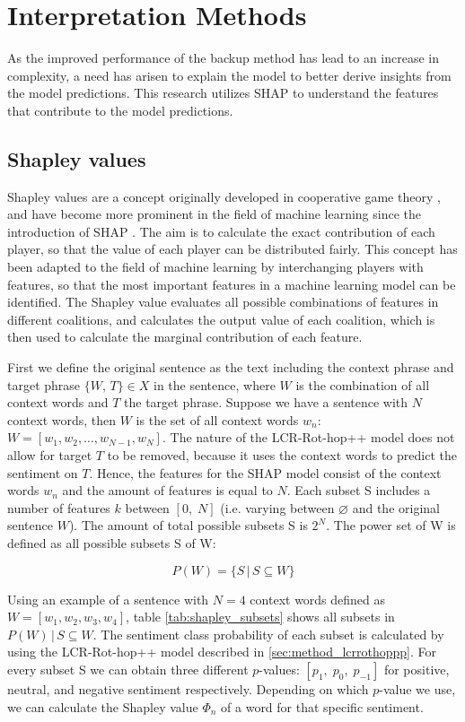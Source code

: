 \section{Interpretation Methods}
    \label{sec:method_interpretation}
As the improved performance of the backup method has lead to an increase in complexity, a need has arisen to explain the model to better derive insights from the model predictions. This research utilizes SHAP to understand the features that contribute to the model predictions. 

\subsection{Shapley values}
    \label{sec:method_shapley}
Shapley values are a concept originally developed in cooperative game theory \cite{Shapley}, and have become more prominent in the field of machine learning since the introduction of SHAP \cite{Lundberg}. The aim is to calculate the exact contribution of each player, so that the value of each player can be distributed fairly. This concept has been adapted to the field of machine learning by interchanging players with features, so that the most important features in a machine learning model can be identified. The Shapley value evaluates all possible combinations of features in different coalitions, and calculates the output value of each coalition, which is then used to calculate the marginal contribution of each feature.

First we define the original sentence as the text including the context phrase and target phrase $\{W,\, T\} \in X$ in the sentence, where $W$ is the combination of all context words and $T$ the target phrase. Suppose we have a sentence with $N$ context words, then $W$ is the set of all context words $w_n$: $W=[w_1, w_2, \ldots, w_{N-1}, w_N]$. The nature of the LCR-Rot-hop++ model does not allow for target $T$ to be removed, because it uses the context words to predict the sentiment on $T$. Hence, the features for the SHAP model consist of the context words $w_n$ and the amount of features is equal to $N$. Each subset S includes a number of features $k$ between $[0,\;N]$ (i.e. varying between $\varnothing$ and the original sentence $W$). The amount of total possible subsets S is $2^N$. The power set of W is defined as all possible subsets S of W:

$$
P(W)= \{S \,|\, S \subseteq W\}
$$

Using an example of a sentence with $N = 4$ context words defined as $W=[w_1, w_2, w_3, w_4]$, table \ref{tab:shapley_subsets} shows all subsets in $P(W) \,|\, S \subseteq W$. The sentiment class probability of each subset is calculated by using the LCR-Rot-hop++ model described in \ref{sec:method_lcrrothoppp}. For every subset S we can obtain three different $p$-values: $[p_1,\; p_0,\; p_{-1}]$ for positive, neutral, and negative sentiment respectively. Depending on which $p$-value we use, we can calculate the Shapley value $\Phi_n$ of a word for that specific sentiment.

